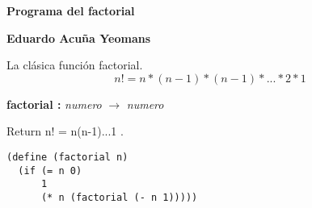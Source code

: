 \documentclass[letterpaper, 12pt]{article}
\begin{document}
\hfill {\LARGE \textbf{Programa del factorial} }

\bigskip


\hfill {\large \textbf{Eduardo Acuña Yeomans} }

\bigskip


\bigskip

La clásica función factorial.
$$n!=n*(n-1)*(n-1)*...*2*1$$

\bigskip


\bigskip

\bigskip

\textbf{factorial :} \emph{numero} $\boldsymbol{\rightarrow}$ \emph{numero}


Return n! = n(n-1)...1 .
\begin{verbatim}
(define (factorial n)
  (if (= n 0)
      1
      (* n (factorial (- n 1)))))
\end{verbatim}
\end{document}
